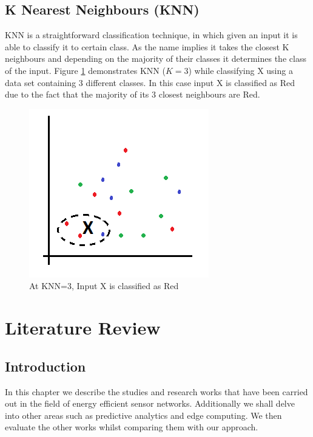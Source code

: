 \documentclass{mproj}
\begin{document}
\section{K Nearest Neighbours (KNN)}
\label{sec:knnExplanation}
KNN \cite{knn} is a straightforward classification technique, in which given an input it is able to classify it to certain class. As the name implies it takes the closest K neighbours and depending on the majority of their classes it determines the class of the input. Figure \ref{fig:knn} demonstrates KNN ($K=3$) while classifying X using a data set containing 3 different classes. In this case input X is classified as Red due to the fact that the majority of its 3 closest neighbours are Red.
\begin{figure}[H]
\caption{At KNN=3, Input X is classified as Red}
\label{fig:knn}
\centerline{\includegraphics[scale=1]{knn}}
\end{figure}

\chapter{Literature Review}
\section{Introduction}
In this chapter we describe the studies and research works that have been carried out in the field of energy efficient sensor networks. Additionally we shall delve into other areas such as predictive analytics and edge computing. We then evaluate the other works whilst comparing them with our approach.
\end{document}

